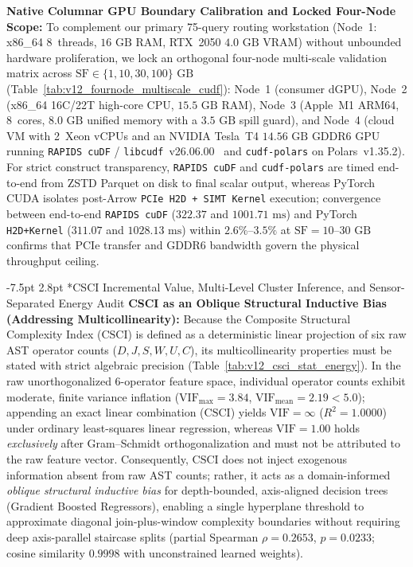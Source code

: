 \documentclass[10pt,a4paper]{article}
\makeatletter
\renewcommand\subsection{\@startsection{subsection}{2}{\z@}%
  {-7.5pt \@plus -2pt \@minus -1pt}%
  {2.8pt \@plus 1pt}%
  {\normalfont\normalsize\bfseries}}
\makeatother
\begin{document}
\noindent\textbf{Native Columnar GPU Boundary Calibration and Locked Four-Node Scope:} To complement our primary 75-query routing workstation (Node~1: x86\_64 8~threads, $16\text{ GB}$ RAM, RTX~2050 $4.0\text{ GB}$ VRAM) without unbounded hardware proliferation, we lock an orthogonal four-node multi-scale validation matrix across $\text{SF}\in\{1,10,30,100\}\text{ GB}$ (Table~\ref{tab:v12_fournode_multiscale_cudf}): Node~1 (consumer dGPU), Node~2 (x86\_64 16C/22T high-core CPU, $15.5\text{ GB}$ RAM), Node~3 (Apple~M1 ARM64, 8~cores, $8.0\text{ GB}$ unified memory with a $3.5\text{ GB}$ spill guard), and Node~4 (cloud VM with 2~Xeon vCPUs and an NVIDIA Tesla~T4 $14.56\text{ GB}$ GDDR6 GPU running \texttt{RAPIDS cuDF} / \texttt{libcudf}~v26.06.00~\cite{rapids2024cudf} and \texttt{cudf-polars} on Polars~v1.35.2). For strict construct transparency, \texttt{RAPIDS cuDF} and \texttt{cudf-polars} are timed end-to-end from ZSTD Parquet on disk to final scalar output, whereas PyTorch CUDA isolates post-Arrow \texttt{PCIe H2D + SIMT Kernel} execution; convergence between end-to-end \texttt{RAPIDS cuDF} ($322.37$ and $1001.71\text{ ms}$) and PyTorch \texttt{H2D+Kernel} ($311.07$ and $1028.13\text{ ms}$) within $2.6\%\text{--}3.5\%$ at $\text{SF}=10\text{--}30\text{ GB}$ confirms that PCIe transfer and GDDR6 bandwidth govern the physical throughput ceiling.

\subsection*{CSCI Incremental Value, Multi-Level Cluster Inference, and Sensor-Separated Energy Audit}
\noindent\textbf{CSCI as an Oblique Structural Inductive Bias (Addressing Multicollinearity):} Because the Composite Structural Complexity Index ($\text{CSCI}$) is defined as a deterministic linear projection of six raw AST operator counts ($D, J, S, W, U, C$), its multicollinearity properties must be stated with strict algebraic precision (Table~\ref{tab:v12_csci_stat_energy}). In the raw unorthogonalized 6-operator feature space, individual operator counts exhibit moderate, finite variance inflation ($\text{VIF}_{\max}=3.84$, $\text{VIF}_{\text{mean}}=2.19 < 5.0$); appending an exact linear combination ($\text{CSCI}$) yields $\text{VIF}=\infty$ ($R^{2}=1.0000$) under ordinary least-squares linear regression, whereas $\text{VIF}=1.00$ holds \emph{exclusively} after Gram--Schmidt orthogonalization and must not be attributed to the raw feature vector. Consequently, $\text{CSCI}$ does not inject exogenous information absent from raw AST counts; rather, it acts as a domain-informed \emph{oblique structural inductive bias} for depth-bounded, axis-aligned decision trees (Gradient Boosted Regressors), enabling a single hyperplane threshold to approximate diagonal join-plus-window complexity boundaries without requiring deep axis-parallel staircase splits (partial Spearman $\rho=0.2653$, $p=0.0233$; cosine similarity $0.9998$ with unconstrained learned weights).
\end{document}
